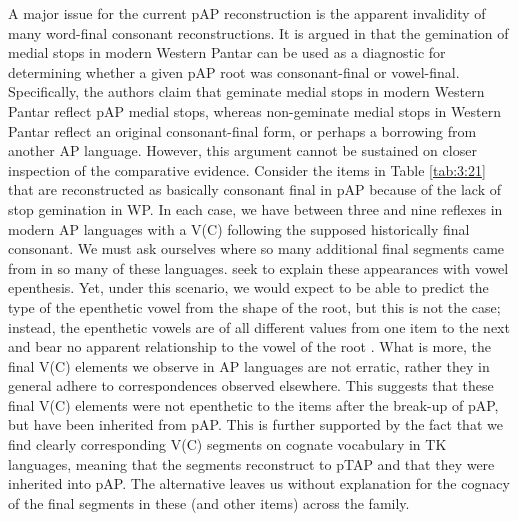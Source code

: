 \documentclass[output=paper]{LSP/langsci}
\begin{document}
A major issue for the current pAP reconstruction is the apparent invalidity of many word-final consonant reconstructions. It is argued in \citet[95]{HoltonEtAl2012} that the gemination of medial stops in modern Western Pantar can be used as a diagnostic for determining whether a given pAP root was consonant-final or vowel-final. Specifically, the authors claim that geminate medial stops in modern Western Pantar reflect pAP medial stops, whereas non-geminate medial stops in Western Pantar reflect an original consonant-final form, or perhaps a borrowing from another AP language. However, this argument cannot be sustained on closer inspection of the comparative evidence. Consider the items in Table \ref{tab:3:21} that are reconstructed as basically consonant final in pAP because of the lack of stop gemination in WP. In each case, we have between three and nine reflexes in modern AP languages with a V(C) following the supposed historically final consonant. We must ask ourselves where so many additional final segments came 
from in so many of these languages. \citet{HoltonEtAl2012} seek to explain these appearances with vowel epenthesis. Yet, under this scenario, we would expect to be able to predict the type of the epenthetic vowel from the shape of the root, but this is not the case; instead, the epenthetic vowels are of all different values from one item to the next and bear no apparent relationship to the vowel of the root \citep[as defined by][]{HoltonEtAl2012}. What is more, the final V(C) elements we observe in AP languages are not erratic, rather they in general adhere to correspondences observed elsewhere. This suggests that these final V(C) elements were not epenthetic to the items after the break-up of pAP, but have been inherited from pAP. This is further supported by the fact that we find clearly corresponding V(C) segments on cognate vocabulary in TK languages, meaning that the segments reconstruct to pTAP and that they were inherited into pAP. The alternative leaves us without explanation for the cognacy of the final 
segments in these (and other items) across the family. 
 
\end{document}
